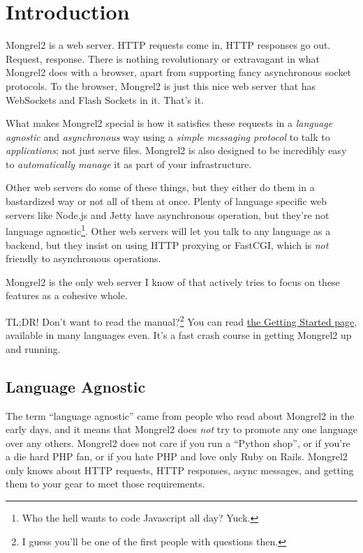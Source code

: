 \chapter{Introduction}

Mongrel2 is a web server.  HTTP requests come in, HTTP responses go out.
Request, response.  There is nothing revolutionary or extravagant in what
Mongrel2 does with a browser, apart from supporting fancy asynchronous socket
protocols.  To the browser, Mongrel2 is just this nice web server that has
WebSockets and Flash Sockets in it.  That's it.

What makes Mongrel2 special is how it satisfies these requests in a \emph{
language agnostic} and \emph{asynchronous} way using a \emph{simple messaging
protocol} to talk to \emph{applications}; not just serve files.  Mongrel2 is also
designed to be incredibly easy to \emph{automatically manage} it as part of your
infrastructure.

Other web servers do some of these things, but they either do them in a bastardized
way or not all of them at once.  Plenty of language specific web servers like Node.js
and Jetty have asynchronous operation, but they're not language
agnostic\footnote{Who the hell wants to code Javascript all day?  Yuck.}.  Other web servers
will let you talk to any language as a backend, but they insist on using HTTP
proxying or FastCGI, which is \emph{not} friendly to asynchronous operations.

Mongrel2 is the only web server I know of that actively tries to focus on these
features as a cohesive whole.

\begin{aside}{TL;DR!}
Don't want to read the manual?\footnote{I guess you'll be one of the first people with questions then.}
You can read \href{http://mongrel2.org/wiki/quick_start.html}{the Getting Started page},  available in
many languages even.  It's a fast crash course in getting Mongrel2 up and running.
\end{aside}

\section{Language Agnostic}

The term ``language agnostic'' came from people who read about Mongrel2 in the
early days, and it means that Mongrel2 does \emph{not} try to promote any one
language over any others.  Mongrel2 does not care if you run a ``Python shop'', or
if you're a die hard PHP fan, or if you hate PHP and love only Ruby on Rails.
Mongrel2 only knows about HTTP requests, HTTP responses, async messages, and
getting them to your gear to meet those requirements.

